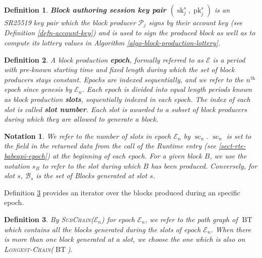 \documentclass{book}
\newcommand{\tmname}[1]{\textsc{#1}}
\newcommand{\tmop}[1]{\ensuremath{\operatorname{#1}}}
\newcommand{\tmstrong}[1]{\textbf{#1}}
\newcommand{\tmtextbf}[1]{{\bfseries{#1}}}
\newcommand{\tmtextsc}[1]{{\scshape{#1}}}
\newcommand{\tmtexttt}[1]{{\ttfamily{#1}}}
\newcommand{\tmverbatim}[1]{{\ttfamily{#1}}}
\newtheorem{definition}{Definition}
\newtheorem{notation}{Notation}
\providecommand{\tmname}[1]{\tmtextsc{#1}}
\providecommand{\tmop}[1]{\ensuremath{\mathrm{#1}}}
\providecommand{\tmstrong}[1]{\tmtextbf{#1}}
\providecommand{\tmtextbf}[1]{\tmtextbf{#1}}
\providecommand{\tmverbatim}[1]{\tmtexttt{#1}}
\newtheorem{definition}{Definition}
\newtheorem{notation}{Notation}
\begin{document}
\begin{definition}
  {\tmstrong{Block authoring session key pair $(\tmop{sk}^s_j,
  \tmop{pk}^s_j)$}} is an SR25519 key pair which the block producer
  $\mathcal{P}_j$ signs by their account key (see Definition
  \ref{defn-account-key}) and is used to sign the produced block as well as to
  compute its lottery values in Algorithm \ref{algo-block-production-lottery}.
  
\end{definition}

\begin{definition}
  \label{defn-epoch-slot}A block production {\tmstrong{epoch}}, formally
  referred to as $\mathcal{E}$ is a period with pre-known starting time and
  fixed length during which the set of block producers stays constant. Epochs
  are indexed sequentially, and we refer to the $n^{\tmop{th}}$ epoch since
  genesis by $\mathcal{E}_n$. Each epoch is divided into equal length periods
  known as block production {\tmstrong{slots}}, sequentially indexed in each
  epoch. The index of each slot is called {\tmstrong{slot number}}. Each slot
  is awarded to a subset of block producers during which they are allowed to
  generate a block.
\end{definition}

\begin{notation}
  \label{note-slot}We refer to the number of slots in epoch $\mathcal{E}_n$ by
  $\tmop{sc}_n$. $\tmop{sc}_n$ is set to the \tmverbatim{duration} field in
  the returned data from the call of the Runtime entry
  \tmverbatim{BabeApi\_epoch} (see \ref{sect-rte-babeapi-epoch}) at the
  beginning of each epoch. For a given block $B$, we use the notation
  {\tmstrong{$s_B$}} to refer to the slot during which $B$ has been produced.
  Conversely, for slot $s$, $\mathcal{B}_s$ is the set of Blocks generated at
  slot $s$.
\end{notation}

Definition \ref{defn-epoch-subchain} provides an iterator over the blocks
produced during an specific epoch.

\begin{definition}
  \label{defn-epoch-subchain} By {\tmname{SubChain($\mathcal{E}_n$)}} for
  epoch $\mathcal{E}_n$, we refer to the path graph of $\tmop{BT}$ which
  contains all the blocks generated during the slots of epoch $\mathcal{E}_n$.
  When there is more than one block generated at a slot, we choose the one
  which is also on {\tmname{Longest-Chain($\tmop{BT}$)}}.
\end{definition}
\end{document}
